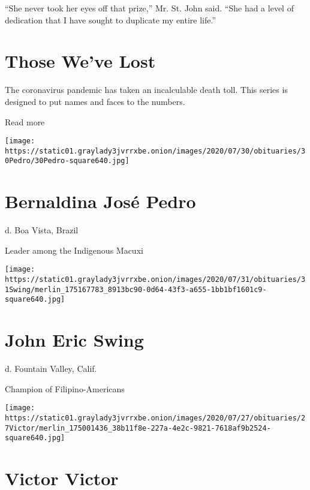 ``She never took her eyes off that prize,'' Mr. St. John said. ``She had
a level of dedication that I have sought to duplicate my entire life.''

\href{https://www.nytimes3xbfgragh.onion/interactive/2020/obituaries/people-died-coronavirus-obituaries.html?action=click\&pgtype=Article\&state=default\&region=BELOW_MAIN_CONTENT\&context=covid_obits_promo}{}

\hypertarget{those-weve-lost}{%
\section{Those We've Lost}\label{those-weve-lost}}

The coronavirus pandemic has taken an incalculable death toll. This
series is designed to put names and faces to the numbers.

Read more

\texttt{[image: https://static01.graylady3jvrrxbe.onion/images/2020/07/30/obituaries/30Pedro/30Pedro-square640.jpg]}

\hypertarget{bernaldina-josuxe9-pedro}{%
\section{Bernaldina José Pedro}\label{bernaldina-josuxe9-pedro}}

d. Boa Vista, Brazil

Leader among the Indigenous Macuxi

\texttt{[image: https://static01.graylady3jvrrxbe.onion/images/2020/07/31/obituaries/31Swing/merlin\_175167783\_8913bc90-0d64-43f3-a655-1bb1bf1601c9-square640.jpg]}

\hypertarget{john-eric-swing}{%
\section{John Eric Swing}\label{john-eric-swing}}

d. Fountain Valley, Calif.

Champion of Filipino-Americans

\texttt{[image: https://static01.graylady3jvrrxbe.onion/images/2020/07/27/obituaries/27Victor/merlin\_175001436\_38b11f8e-227a-4e2c-9821-7618af9b2524-square640.jpg]}

\hypertarget{victor-victor}{%
\section{Victor Victor}\label{victor-victor}}

